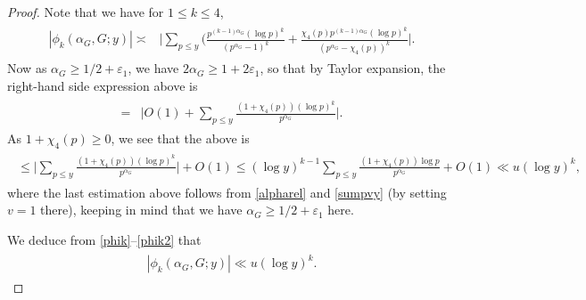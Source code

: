 \documentclass[10pt,a4paper]{amsart}
\begin{document}
\begin{proof}
  Note that we have for $1 \leq k \leq 4$,
\begin{align}
\label{phik}
\begin{split}
  |\phi_k(\alpha_G,G;y)| \asymp & \Big|\sum_{p \leq y}(\frac {p^{(k-1)\alpha_G}(\log p)^k}{(p^{\alpha_G}-1)^k}+\frac {\chi_4(p)p^{(k-1)\alpha_G}(\log p)^k}{(p^{\alpha_G}-\chi_4(p))^k}\Big |.
\end{split}
\end{align}     
   Now as $\alpha_G \geq 1/2+\varepsilon_1$, we have $2\alpha_G \geq 1+2\varepsilon_1$, so that by Taylor expansion, the right-hand side expression above is
\begin{align}
\label{phik1}
\begin{split}
  = & \Big|O(1)+\sum_{p \leq y}\frac {(1+\chi_4(p))(\log p)^k}{p^{\alpha_G}}\Big |. 
\end{split}
\end{align}     
  As $1+\chi_4(p) \geq 0$, we see that the above is
\begin{align}
\label{phik2}
\begin{split}
  \leq \Big |\sum_{p \leq y}\frac {(1+\chi_4(p))(\log p)^k}{p^{\alpha_G}}\Big |+O(1)
  \leq (\log y)^{k-1} \sum_{p \leq y}\frac {(1+\chi_4(p))\log p}{p^{\alpha_G}}+O(1) \ll u(\log y)^{k}, 
\end{split}
\end{align} 
 where the last estimation above follows from \eqref{alpharel} and \eqref{sumpvy} (by setting $v=1$ there), keeping in mind that we have $\alpha_G \geq 1/2+\varepsilon_1$ here.   
  
  We deduce from \eqref{phik}--\eqref{phik2} that
\begin{align}
\label{phikupper}
\begin{split}
  |\phi_k(\alpha_G,G;y)| \ll u(\log y)^{k}.
\end{split}
\end{align} 


\end{proof}
\end{document}
